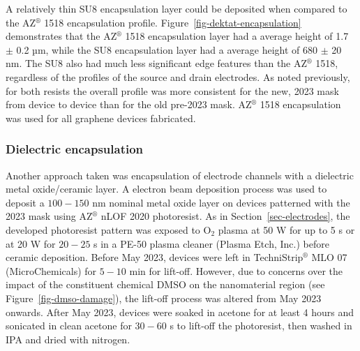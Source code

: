 \documentclass[
  a4paper,
]{scrbook}
\begin{document}
A relatively thin SU8 encapsulation layer could be deposited when
compared to the AZ\(^\circledR\) 1518 encapsulation profile.
Figure~\ref{fig-dektat-encapsulation} demonstrates that the
AZ\(^\circledR\) 1518 encapsulation layer had a average height of 1.7
\(\pm\) 0.2 µm, while the SU8 encapsulation layer had a average height
of 680 \(\pm\) 20 nm. The SU8 also had much less significant edge
features than the AZ\(^\circledR\) 1518, regardless of the profiles of
the source and drain electrodes. As noted previously, for both resists
the overall profile was more consistent for the new, 2023 mask from
device to device than for the old pre-2023 mask. AZ\(^\circledR\) 1518
encapsulation was used for all graphene devices fabricated.

\hypertarget{dielectric-encapsulation}{%
\subsubsection*{Dielectric
encapsulation}\label{dielectric-encapsulation}}

Another approach taken was encapsulation of electrode channels with a
dielectric metal oxide/ceramic layer. A electron beam deposition process
was used to deposit a \(100-150\) nm nominal metal oxide layer on
devices patterned with the 2023 mask using AZ\(^\circledR\) nLOF 2020
photoresist. As in Section~\ref{sec-electrodes}, the developed
photoresist pattern was exposed to O\(_2\) plasma at 50 W for up to 5 s
or at 20 W for \(20-25\) s in a PE-50 plasma cleaner (Plasma Etch, Inc.)
before ceramic deposition. Before May 2023, devices were left in
TechniStrip\(^\circledR\) MLO 07 (MicroChemicals) for \(5-10\) min for
lift-off. However, due to concerns over the impact of the constituent
chemical DMSO on the nanomaterial region (see
Figure~\ref{fig-dmso-damage}), the lift-off process was altered from May
2023 onwards. After May 2023, devices were soaked in acetone for at
least 4 hours and sonicated in clean acetone for \(30-60\) s to lift-off
the photoresist, then washed in IPA and dried with nitrogen.
\end{document}
